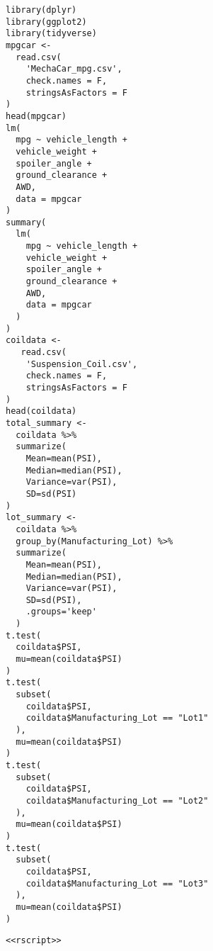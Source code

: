 \documentclass[11pt]{article}
\begin{document}
\begin{verbatim}
library(dplyr)
library(ggplot2)
library(tidyverse)
mpgcar <-
  read.csv(
    'MechaCar_mpg.csv',
    check.names = F,
    stringsAsFactors = F
)
head(mpgcar)
lm(
  mpg ~ vehicle_length +
  vehicle_weight +
  spoiler_angle +
  ground_clearance +
  AWD,
  data = mpgcar
)
summary(
  lm(
    mpg ~ vehicle_length +
    vehicle_weight +
    spoiler_angle +
    ground_clearance +
    AWD,
    data = mpgcar
  )
)
coildata <-
   read.csv(
    'Suspension_Coil.csv',
    check.names = F,
    stringsAsFactors = F
)
head(coildata)
total_summary <-
  coildata %>%
  summarize(
    Mean=mean(PSI),
    Median=median(PSI),
    Variance=var(PSI),
    SD=sd(PSI)
)
lot_summary <-
  coildata %>%
  group_by(Manufacturing_Lot) %>%
  summarize(
    Mean=mean(PSI),
    Median=median(PSI),
    Variance=var(PSI),
    SD=sd(PSI),
    .groups='keep'
  )
t.test(
  coildata$PSI,
  mu=mean(coildata$PSI)
)
t.test(
  subset(
    coildata$PSI,
    coildata$Manufacturing_Lot == "Lot1"
  ),
  mu=mean(coildata$PSI)
)
t.test(
  subset(
    coildata$PSI,
    coildata$Manufacturing_Lot == "Lot2"
  ),
  mu=mean(coildata$PSI)
)
t.test(
  subset(
    coildata$PSI,
    coildata$Manufacturing_Lot == "Lot3"
  ),
  mu=mean(coildata$PSI)
)
\end{verbatim}

\begin{verbatim}
<<rscript>>
\end{verbatim}
\end{document}
